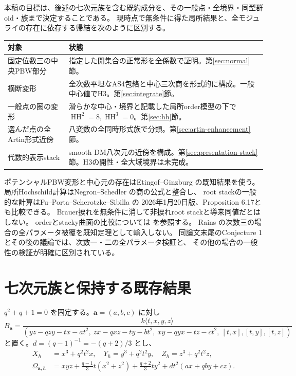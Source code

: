 \documentclass[11pt,a4paper]{ltjsarticle}
\theoremstyle{definition}\newtheorem{definition}[theorem]{定義}
\theoremstyle{remark}\newtheorem{remark}[theorem]{注意}
\newcommand{\HH}{\operatorname{HH}}
\begin{document}
本稿の目標は、後述の七次元族を含む既約成分を、その一般点・全境界・同型群oid・族まで決定することである。
現時点で無条件に得た局所結果と、全モジュライの存在に依存する帰結を次のように区別する。
\begin{center}\begin{tabular}{p{}p{}}\toprule
対象&状態\\\midrule
固定位数三の中央PBW部分&指定した開集合の正常形を全係数で証明。第\ref{sec:normal}節。\\
横断変形&全次数平坦なAS4包絡と中心三次商を形式的に構成。一般中心値でH3。第\ref{sec:integrate}節。\\
一般点の圏の変形&滑らかな中心・境界と記載した局所order模型の下で $\HH^2=8,\HH^3=0$。第\ref{sec:hh}節。\\
選んだ点の全Artin形式近傍&八変数の全同時形式族で分類。第\ref{sec:artin-enhancement}節。\\
代数的表示stack&smooth DM八次元の近傍を構成。第\ref{sec:presentation-stack}節。H3の開性・全大域境界は未完成。\\\bottomrule
\end{tabular}\end{center}

ポテンシャルPBW変形と中心元の存在はEtingof--Ginzburg \cite{EG} の既知結果を使う。
局所Hochschild計算はNegron--Schedler \cite{NS} の商の公式と整合し、
root stackの一般的な計算はFu--Porta--Scherotzke--Sibilla \cite{FPSS} の
2026年1月20日版、Proposition 6.17とも比較できる。
Brauer捩れを無条件に消して非捩れroot stackと導来同値だとはしない。
orderとstacky曲面の比較については \cite{FIOS} を参照する。
Rains \cite{Rains} の次数三の場合の全パラメータ被覆を既知定理として輸入しない。
同論文末尾のConjecture 1とその後の議論では、次数一・二の全パラメータ検証と、
その他の場合の一般性の検証が明確に区別されている。

\section{七次元族と保持する既存結果}\label{sec:seven}
$q^2+q+1=0$ を固定する。$\mathbf a=(a,b,c)$ に対し
\begin{equation}\label{eq:B}
B_{\mathbf a}=\frac{k\langle t,x,y,z\rangle}
{(yz-qzy-tx-at^2,\ zx-qxz-ty-bt^2,\ xy-qyx-tz-ct^2,\ [t,x],[t,y],[t,z])}
\end{equation}
と置く。$d=(q-1)^{-1}=-(q+2)/3$ とし、
\begin{align}
X_h&=x^3+q^2t^2x,\quad Y_h=y^3+q^2t^2y,\quad Z_h=z^3+q^2t^2z,\\
\Omega_{\mathbf a,h}&=xyz+\frac{q-1}{3}t(x^2+z^2)+\frac{q+2}{3}ty^2
                 +dt^2(ax+qby+cz).\label{eq:Omega}
\end{align}
\end{document}
